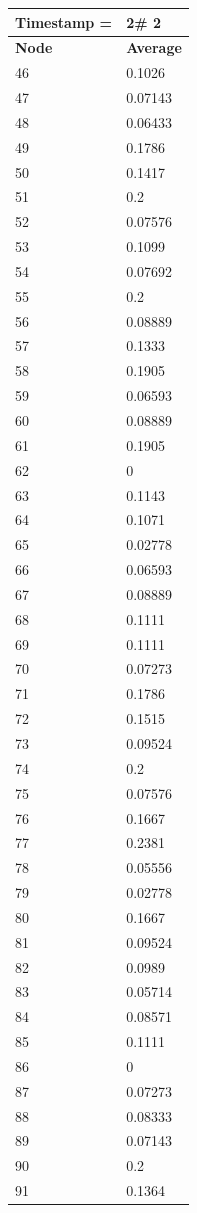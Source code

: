 \begin{tabular}{|l||l|}
\hline
\textbf{Timestamp =} & \textbf{2}\# 2\\\hline
	\textbf{Node} & \textbf{Average} \\ \hline
\hline
	46 & 0.1026 \\ \hline
	47 & 0.07143 \\ \hline
	48 & 0.06433 \\ \hline
	49 & 0.1786 \\ \hline
	50 & 0.1417 \\ \hline
	51 & 0.2 \\ \hline
	52 & 0.07576 \\ \hline
	53 & 0.1099 \\ \hline
	54 & 0.07692 \\ \hline
	55 & 0.2 \\ \hline
	56 & 0.08889 \\ \hline
	57 & 0.1333 \\ \hline
	58 & 0.1905 \\ \hline
	59 & 0.06593 \\ \hline
	60 & 0.08889 \\ \hline
	61 & 0.1905 \\ \hline
	62 & 0 \\ \hline
	63 & 0.1143 \\ \hline
	64 & 0.1071 \\ \hline
	65 & 0.02778 \\ \hline
	66 & 0.06593 \\ \hline
	67 & 0.08889 \\ \hline
	68 & 0.1111 \\ \hline
	69 & 0.1111 \\ \hline
	70 & 0.07273 \\ \hline
	71 & 0.1786 \\ \hline
	72 & 0.1515 \\ \hline
	73 & 0.09524 \\ \hline
	74 & 0.2 \\ \hline
	75 & 0.07576 \\ \hline
	76 & 0.1667 \\ \hline
	77 & 0.2381 \\ \hline
	78 & 0.05556 \\ \hline
	79 & 0.02778 \\ \hline
	80 & 0.1667 \\ \hline
	81 & 0.09524 \\ \hline
	82 & 0.0989 \\ \hline
	83 & 0.05714 \\ \hline
	84 & 0.08571 \\ \hline
	85 & 0.1111 \\ \hline
	86 & 0 \\ \hline
	87 & 0.07273 \\ \hline
	88 & 0.08333 \\ \hline
	89 & 0.07143 \\ \hline
	90 & 0.2 \\ \hline
	91 & 0.1364 \\ \hline
\end{tabular}
